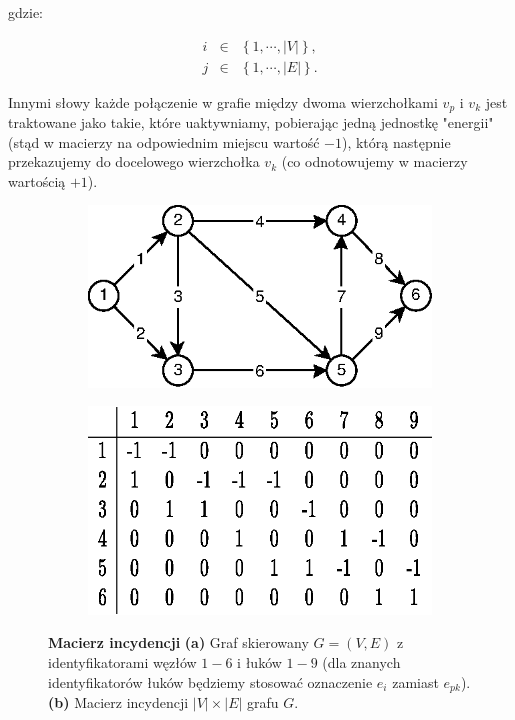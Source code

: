 gdzie:

\begin{equation}
	\begin{array}{lll}
	i & \in & \left\{ 1, \cdots, \left| V \right| \right\} \textrm{,} \\
	j & \in & \left\{ 1, \cdots, \left| E \right| \right\} \textrm{.}
	\end{array}
\end{equation}

Innymi słowy każde połączenie w grafie między dwoma wierzchołkami $v_{p}$ i $v_{k}$ jest traktowane jako takie, które uaktywniamy, pobierając jedną jednostkę "energii" (stąd w macierzy na odpowiednim miejscu wartość $-1$), którą następnie przekazujemy do docelowego wierzchołka $v_{k}$ (co odnotowujemy w macierzy wartością $+1$).

\begin{figure}[!htbp]
	\centering
	\begin{subfigure}[b]{0.45\textwidth}
		\includegraphics[width=\textwidth]{Chapter_I/1/1_1a.eps}
		\caption{}
	\end{subfigure}%
	\qquad
	\begin{subfigure}[b]{0.45\textwidth}
		\includegraphics[width=\textwidth]{Chapter_I/1/1_1b.eps}
		\caption{}
	\end{subfigure}
	\caption{\textbf{Macierz incydencji} \textbf{(a)} Graf skierowany $G = \left( V, E \right)$ z identyfikatorami węzłów $1-6$ i łuków $1-9$ (dla znanych identyfikatorów łuków będziemy stosować oznaczenie $e_{i}$ zamiast $e_{pk}$). \textbf{(b)} Macierz incydencji $ \left| V \right| \times \left| E \right| $ grafu $G$.}\label{fig:incidenceMatrix}
\end{figure}

